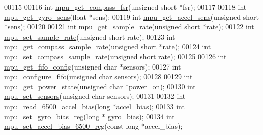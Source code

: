 \begin{DoxyCode}
00115 
00116 \textcolor{keywordtype}{int} \hyperlink{group___d_r_i_v_e_r_s_gade8589573d09e0f14b84130428f286df}{mpu\_get\_compass\_fsr}(\textcolor{keywordtype}{unsigned} \textcolor{keywordtype}{short} *fsr);
00117 
00118 \textcolor{keywordtype}{int} \hyperlink{group___d_r_i_v_e_r_s_ga023c0cc94aa8f162dc33b15048a49421}{mpu\_get\_gyro\_sens}(\textcolor{keywordtype}{float} *sens);
00119 \textcolor{keywordtype}{int} \hyperlink{group___d_r_i_v_e_r_s_ga620408949052b96e856cad920f856583}{mpu\_get\_accel\_sens}(\textcolor{keywordtype}{unsigned} \textcolor{keywordtype}{short} *sens);
00120 
00121 \textcolor{keywordtype}{int} \hyperlink{group___d_r_i_v_e_r_s_ga2487dd551b701c1c7ed4d6335f02b2f1}{mpu\_get\_sample\_rate}(\textcolor{keywordtype}{unsigned} \textcolor{keywordtype}{short} *rate);
00122 \textcolor{keywordtype}{int} \hyperlink{group___d_r_i_v_e_r_s_ga0144d666a67a82888b8580002afe8b55}{mpu\_set\_sample\_rate}(\textcolor{keywordtype}{unsigned} \textcolor{keywordtype}{short} rate);
00123 \textcolor{keywordtype}{int} \hyperlink{group___d_r_i_v_e_r_s_gab5a45cd7783f6937788c0decb0b18b16}{mpu\_get\_compass\_sample\_rate}(\textcolor{keywordtype}{unsigned} \textcolor{keywordtype}{short} *rate);
00124 \textcolor{keywordtype}{int} \hyperlink{group___d_r_i_v_e_r_s_ga78da3828de0ef9d080c4d03e7bc45e7b}{mpu\_set\_compass\_sample\_rate}(\textcolor{keywordtype}{unsigned} \textcolor{keywordtype}{short} rate);
00125 
00126 \textcolor{keywordtype}{int} \hyperlink{group___d_r_i_v_e_r_s_ga093f11eb10b2639a4b9fe344ea348c54}{mpu\_get\_fifo\_config}(\textcolor{keywordtype}{unsigned} \textcolor{keywordtype}{char} *sensors);
00127 \textcolor{keywordtype}{int} \hyperlink{group___d_r_i_v_e_r_s_gababbdda287e1f19323489f90a0889dd7}{mpu\_configure\_fifo}(\textcolor{keywordtype}{unsigned} \textcolor{keywordtype}{char} sensors);
00128 
00129 \textcolor{keywordtype}{int} \hyperlink{group___d_r_i_v_e_r_s_gaec8fa7a067988d174516bb735a4a0bc9}{mpu\_get\_power\_state}(\textcolor{keywordtype}{unsigned} \textcolor{keywordtype}{char} *power\_on);
00130 \textcolor{keywordtype}{int} \hyperlink{group___d_r_i_v_e_r_s_ga6e77e7cc1cf6be5e8fdf617c5b4586d1}{mpu\_set\_sensors}(\textcolor{keywordtype}{unsigned} \textcolor{keywordtype}{char} sensors);
00131 
00132 \textcolor{keywordtype}{int} \hyperlink{group___d_r_i_v_e_r_s_ga57bfbb356ce449135ce39659455041ae}{mpu\_read\_6500\_accel\_bias}(\textcolor{keywordtype}{long} *accel\_bias);
00133 \textcolor{keywordtype}{int} \hyperlink{group___d_r_i_v_e_r_s_ga01361a0f5c1f048cb0742bd3d0e4d3a5}{mpu\_set\_gyro\_bias\_reg}(\textcolor{keywordtype}{long} * gyro\_bias);
00134 \textcolor{keywordtype}{int} \hyperlink{group___d_r_i_v_e_r_s_gaa7265afee29b8307ff49a8b1ccd9238a}{mpu\_set\_accel\_bias\_6500\_reg}(\textcolor{keyword}{const} \textcolor{keywordtype}{long} *accel\_bias);

\end{DoxyCode}
